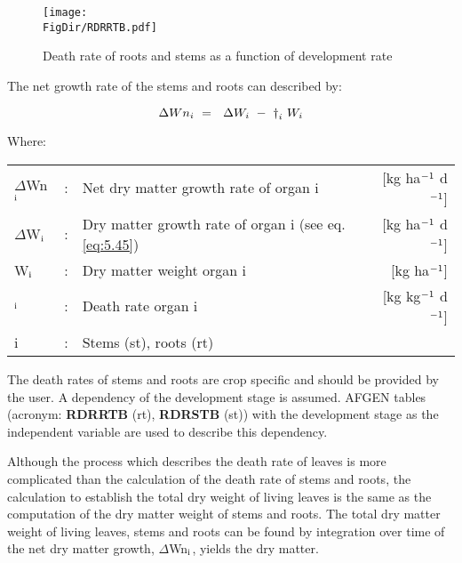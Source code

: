 \begin{figure}[p]
	\centering
	\texttt{[image: \\FigDir/RDRRTB.pdf]}
	\caption{Death rate of roots and stems as a function of development rate}
	\label{fig:DeathRoots}
\end{figure}


The net growth rate of the stems and roots can described by:

\begin{equation}
\label{eq:5.48}
\Delta Wn _{i~} =~\,\,\Delta W _{i~} -~ {\rm \dag } _{i} \,\, W _{i} 
\end{equation}

Where:\\[5pt]
\begin{tabularx}{\textwidth}{llXr}
	$\Delta$Wn$_{{\rm i}}$ &:& Net dry matter growth rate of organ i   &
	[kg ha$^{{\rm -1}}$ d$^{{\rm -1}}$]\\
	$\Delta$W$_{{\rm i}}$ &:& Dry matter growth rate of organ i (see eq. \ref{eq:5.45})   &
	[kg ha$^{{\rm -1}}$ d$^{{\rm -1}}$]\\
	W$_{{\rm i}}$ &:& Dry matter weight organ i  &
	[kg ha$^{{\rm -1}}$]\\
	\dag $_{{\rm i}}$ &:& Death rate organ i   &
	[kg kg$^{{\rm -1}}$ d$^{{\rm -1}}$]\\
	i &:& Stems (st), roots (rt)\\
\end{tabularx}

The death rates of stems and roots are crop specific and should be provided by the user.
A dependency of the development stage is assumed. AFGEN tables (acronym: {\bf RDRRTB}
(rt), {\bf RDRSTB} (st)) with the development stage as the independent variable are used to
describe this dependency.

Although the process which describes the death rate of leaves is more complicated than
the calculation of the death rate of stems and roots, the calculation to establish the total
dry weight of living leaves is the same as the computation of the dry matter weight of
stems and roots. The total dry matter weight of living leaves, stems and roots can be
found by integration over time of the net dry matter growth, $\Delta$Wn$_{{\rm i}}$, yields 
the dry matter.

